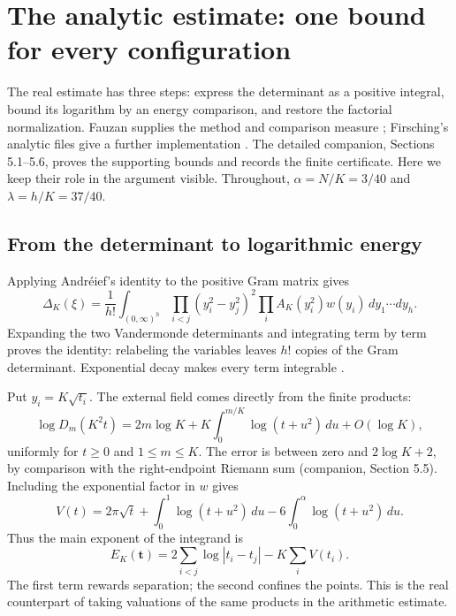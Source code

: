 \section{The analytic estimate: one bound for every configuration}
\label{analytic:section}

The real estimate has three steps: express the determinant as a positive
integral, bound its logarithm by an energy comparison, and restore the
factorial normalization. Fauzan supplies the method and comparison
measure \cite[Section 6 and Appendix A]{fauzan}; Firsching's analytic
files give a further implementation \cite{firsching}.
The detailed companion, Sections 5.1--5.6, proves the supporting bounds
and records the finite certificate. Here we keep their role in the
argument visible.
Throughout, \(\alpha=N/K=3/40\) and \(\lambda=h/K=37/40\).

\subsection{From the determinant to logarithmic energy}

Applying Andr\'eief's identity to the positive Gram matrix gives
\begin{equation}\label{analytic:andreief}
 \Delta_K(\xi)=\frac1{h!}\int_{(0,\infty)^h}
 \prod_{i<j}(y_i^2-y_j^2)^2
 \prod_i A_K(y_i^2)w(y_i)\,dy_1\cdots dy_h.
\end{equation}
Expanding the two Vandermonde determinants and integrating term by term
proves the identity: relabeling the variables leaves \(h!\) copies of
the Gram determinant. Exponential decay makes every term integrable
\cite{andreief}.

Put \(y_i=K\sqrt{t_i}\). The external field comes directly from the
finite products:
\[
 \log D_m(K^2t)
 =2m\log K+K\int_0^{m/K}\log(t+u^2)\,du+O(\log K),
\]
uniformly for \(t\ge0\) and \(1\le m\le K\).
The error is between zero and \(2\log K+2\), by comparison with the
right-endpoint Riemann sum (companion, Section 5.5).
Including the exponential factor in \(w\) gives
\begin{equation}\label{analytic:field}
 V(t)=2\pi\sqrt t+\int_0^1\log(t+u^2)\,du
                 -6\int_0^\alpha\log(t+u^2)\,du.
\end{equation}
Thus the main exponent of the integrand is
\[
 E_K(\mathbf t)=2\sum_{i<j}\log|t_i-t_j|-K\sum_i V(t_i).
\]
The first term rewards separation; the second confines the points.
This is the real counterpart of taking valuations of the same products
in the arithmetic estimate.

